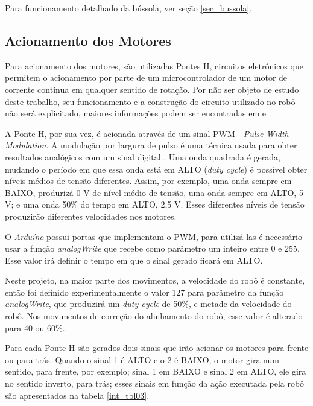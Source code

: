 Para funcionamento detalhado da bússola, ver seção \ref{sec_bussola}.

\subsection{Acionamento dos Motores}
\label{sec_com_motores}

Para acionamento dos motores, são utilizadas Pontes H, circuitos eletrônicos que permitem o acionamento por parte de um microcontrolador de um motor de corrente contínua em qualquer sentido de rotação. Por não ser objeto de estudo deste trabalho, seu funcionamento e a construção do circuito utilizado no robô não será explicitado, maiores informações podem ser encontradas em \cite{Robo2d} e \cite{ponteh}. 

A Ponte H, por sua vez, é acionada através de um sinal PWM - \textit{Pulse Width Modulation}. A modulação por largura de pulso é uma técnica usada para obter resultados analógicos com um sinal digital \cite{arduino3}. Uma onda quadrada é gerada, mudando o período em que essa onda está em ALTO (\textit{duty cycle}) é possível obter níveis médios de tensão diferentes. Assim, por exemplo, uma onda sempre em BAIXO, produrizá 0 V de nível médio de tensão, uma onda sempre em ALTO, 5 V; e uma onda 50\% do tempo em ALTO, 2,5 V. Esses diferentes níveis de tensão produzirão diferentes velocidades nos motores.

O \textit{Arduíno} possui portas que implementam o PWM, para utilizá-las é necessário usar a função \textit{analogWrite} que recebe como parâmetro um inteiro entre 0 e 255. Esse valor irá definir o tempo em que o sinal gerado ficará em ALTO.

Neste projeto, na maior parte dos movimentos, a velocidade do robô é constante, então foi definido experimentalmente o valor 127 para parâmetro da função \textit{analogWrite}, que produzirá um \textit{duty-cycle} de 50\%, e metade da velocidade do robô. Nos movimentos de correção do alinhamento do robô, esse valor é alterado para 40 ou 60\%.

Para cada Ponte H são gerados dois sinais que irão acionar os motores para frente ou para trás. Quando o sinal 1 é ALTO e o 2 é BAIXO, o motor gira num sentido, para frente, por exemplo; sinal 1 em BAIXO e sinal 2 em ALTO, ele gira no sentido inverto, para trás; esses sinais em função da ação executada pela robô são apresentados na tabela \ref{int_tbl03}.

